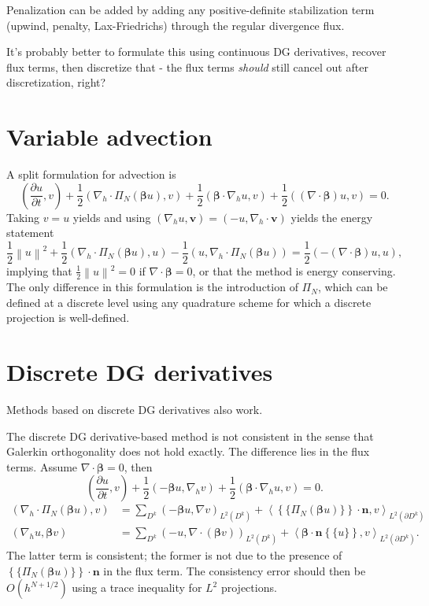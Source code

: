 \documentclass[preprint,10pt]{article}
\theoremstyle{definition}
\theoremstyle{lemma}
\newcommand{\pd}[2]{\frac{\partial#1}{\partial#2}}
\newcommand{\nor}[1]{\left\| #1 \right\|}
\newcommand{\LRp}[1]{\left( #1 \right)}
\newcommand{\LRa}[1]{\left\langle #1 \right\rangle}
\newcommand{\LRc}[1]{\left\{ #1 \right\}}
\newcommand{\Grad} {\ensuremath{\nabla}}
\newcommand{\Div} {\ensuremath{\nabla\cdot}}
\newcommand{\avg}[1] {\ensuremath{\LRc{\!\{#1\}\!}}}
\newcommand{\LK}{L^2\LRp{D^k}}
\newcommand{\LdK}{L^2\LRp{\partial D^k}}
\begin{document}
Penalization can be added by adding any positive-definite stabilization term (upwind, penalty, Lax-Friedrichs) through the regular divergence flux.  

It's probably better to formulate this using continuous DG derivatives, recover flux terms, then discretize that - the flux terms \textit{should} still cancel out after discretization, right?

\section{Variable advection}

A split formulation for advection is 
\[
\LRp{\pd{u}{t},v} + \frac{1}{2}\LRp{\Grad_h\cdot \Pi_N \LRp{ \bm{\beta}u},v} + \frac{1}{2}\LRp{\bm{\beta}\cdot\Grad_h u,v} + \frac{1}{2}\LRp{\LRp{\Grad\cdot \bm{\beta}} u,v} = 0.
\]
Taking $v = u$ yields and using $\LRp{\Grad_h u, \bm{v}} = \LRp{-u, \Grad_h \cdot \bm{v}}$ yields the energy statement
\[
\frac{1}{2}\nor{u}^2 + \frac{1}{2}\LRp{\Grad_h\cdot \Pi_N \LRp{ \bm{\beta}u},u} - \frac{1}{2}\LRp{ u, \Grad_h\cdot \Pi_N\LRp{\bm{\beta}u}} = \frac{1}{2}\LRp{-\LRp{\Grad \cdot \bm{\beta}} u,u},
\]
implying that $\frac{1}{2}\nor{u}^2 = 0$ if $\Grad\cdot \bm{\beta} = 0$, or that the method is energy conserving.  The only difference in this formulation is the introduction of $\Pi_N$, which can be defined at a discrete level using any quadrature scheme for which a discrete projection is well-defined. 


\section{Discrete DG derivatives}

Methods based on discrete DG derivatives also work.  

The discrete DG derivative-based method is not consistent in the sense that Galerkin orthogonality does not hold exactly.  The difference lies in the flux terms.  Assume $\Div \bm{\beta} = 0$, then
\[
\LRp{\pd{u}{t},v} + \frac{1}{2}\LRp{-{ \bm{\beta}u},\Grad_h v} + \frac{1}{2}\LRp{\bm{\beta}\cdot\Grad_h u,v} = 0.
\]
\begin{align*}
\LRp{\Grad_h\cdot \Pi_N\LRp{ \bm{\beta}u},v} &= \sum_{D^k} \LRp{-\bm{\beta}u, \Grad v}_{\LK} + \LRa{\avg{\Pi_N\LRp{\bm{\beta} u}}\cdot \bm{n},v}_{\LdK}\\
\LRp{\Grad_h u,\bm{\beta}v} &= \sum_{D^k} \LRp{-u, \Grad \cdot \LRp{\bm{\beta}v}}_{\LK} + \LRa{\bm{\beta}\cdot\bm{n}\avg{u},v}_{\LdK}.
\end{align*}
The latter term is consistent; the former is not due to the presence of $\avg{\Pi_N\LRp{\bm{\beta} u}}\cdot \bm{n}$ in the flux term.  The consistency error should then be $O(h^{N+1/2})$ using a trace inequality for $L^2$ projections.  
\end{document}

